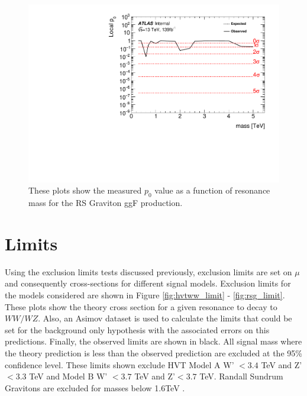 \begin{figure}[h!]
  \centering
  \includegraphics[width=\hsize]{figures/results/pvalues/fixed_pvalues/rsg_pvalue.pdf}
 \caption{These plots show the measured $p_{0}$ value as a function of resonance mass for the RS Graviton ggF production.} 
  \label{fig:discov_rsg}
\end{figure} 
\FloatBarrier


\section{Limits}
Using the exclusion limits tests discussed previously, exclusion limits are set on $\mu$ and consequently cross-sections for different signal models. Exclusion limits for the models considered are shown in Figure \ref{fig:hvtww_limit} - \ref{fig:rsg_limit}. These plots show the theory cross section for a given resonance to decay to $WW/WZ$. Also, an Asimov dataset is used to calculate the limits that could be set for the background only hypothesis with the associated errors on this predictions. Finally, the observed limits are shown in black. All signal mass where the theory prediction is less than the observed prediction are excluded at the 95\% confidence level. These limits shown exclude HVT Model A W' $< 3.4$ TeV and Z' $< 3.3$ TeV and Model B W' $< 3.7$ TeV and Z'$ < 3.7$ TeV. Randall Sundrum Gravitons are excluded for masses below 1.6TeV .


